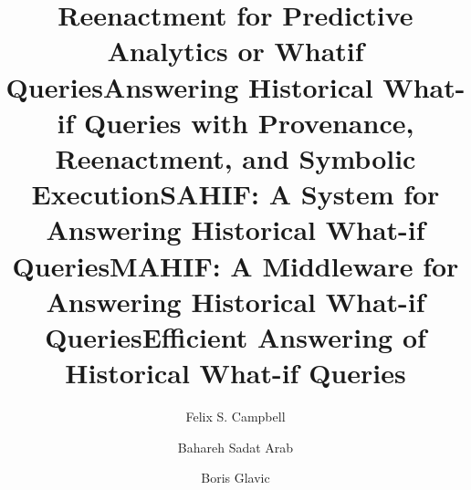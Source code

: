 \documentclass[sigconf]{acmart}
\begin{document}
\fancyhead{}

\title{Reenactment for Predictive Analytics or Whatif Queries}
\title{Answering Historical What-if Queries with Provenance, Reenactment, and Symbolic Execution}
\title{SAHIF: A System for Answering Historical What-if Queries}
\title{MAHIF: A Middleware for Answering Historical What-if Queries}
\title{Efficient Answering of Historical What-if Queries}



\author{Felix S. Campbell}

\author{Bahareh Sadat Arab}


\author{Boris Glavic}

\renewcommand{\shortauthors}{Campbell, et al.}





\lstset{style=psqlcolor}
\end{document}
